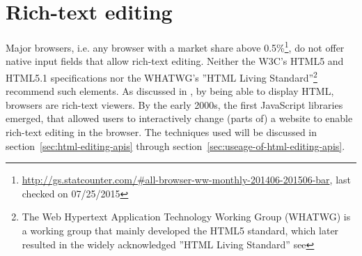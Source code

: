 \section{Rich-text editing}

Major browsers, i.e. any browser with a market share above 0.5\%\footnote{\url{http://gs.statcounter.com/\#all-browser-ww-monthly-201406-201506-bar}, last checked on 07/25/2015}, do not offer native input fields that allow rich-text editing. Neither the W3C's HTML5 and HTML5.1 specifications nor the WHATWG's ''HTML Living Standard''\footnote{The Web Hypertext Application Technology Working Group (WHATWG) is a working group that mainly developed the HTML5 standard, which later resulted in the widely acknowledged ''HTML Living Standard'' see } recommend such elements. As discussed in , by being able to display HTML, browsers are rich-text viewers. By the early 2000s, the first JavaScript libraries emerged, that allowed users to interactively change (parts of) a website to enable rich-text editing in the browser. The techniques used will be discussed in section~\ref{sec:html-editing-apis} through section~\ref{sec:useage-of-html-editing-apis}.

